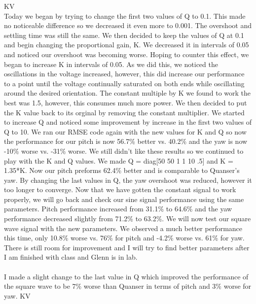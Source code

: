 \documentclass[fontsize=11pt, %
                             paper=letter, %
                             openany, %
                             captions=tableheading,
                             index=totoc,
                             hyperref]{labbook}
\begin{document}
\begin{addmargin}[0cm]{0cm}
KV\\
Today we began by trying to change the first two values of Q to 0.1.  This made no noticeable difference so we decreased it even more to 0.001.  The overshoot and settling time was still the same.  We then decided to keep the values of Q at 0.1 and begin changing the proportional gain, K.  We decreased it in intervals of 0.05 and noticed our overshoot was becoming worse.  Hoping to counter this effect, we began to increase K in intervals of 0.05.  As we did this, we noticed the oscillations in the voltage increased, however, this did increase our performance to a point until the voltage continually saturated on both ends while oscillating around the desired orientation.  The constant multiple by K we found to work the best was 1.5, however, this consumes much more power.  We then decided to put the K value back to its orginal by removing the constant multiplier.  We started to increase Q and noticed some improvement by increase in the first two values of Q to 10.  We ran our RMSE code again with the new values for K and Q so now the performance for our pitch is now 56.7\% better vs. 40.2\% and the yaw is now -10\% worse vs. -31\% worse.  We still didn't like these results so we continued to play with the K and Q values.  We made Q = diag[50 50 1 1 10 .5] and K = 1.35*K.  Now our pitch preforms 62.4\% better and is comparable to Quanser's yaw.  By changing the last values in Q, the yaw overshoot was reduced, however it too longer to converge.  Now that we have gotten the constant signal to work properly, we will go back and check our sine signal performance using the same parameters.  Pitch performance increased from 31.1\% to 64.6\% and the yaw performance decreased slightly from 71.2\% to 63.2\%.  We will now test our square wave signal with the new parameters.  We observed a much better performance this time, only 10.8\% worse vs. 76\% for pitch and -4.2\% worse vs. 61\% for yaw.  There is still room for improvement and I will try to find better parameters after I am finished with class and Glenn is in lab.\\
\\
I made a slight change to the last value in Q which improved the performance of the square wave to be 7\% worse than Quanser in terms of pitch and 3\% worse for yaw.
KV\\


\end{addmargin}
\end{document}
